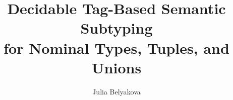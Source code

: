 \documentclass[sigplan,review]{acmart}\settopmatter{printfolios=true,printccs=false,printacmref=false}
\begin{document}
\title[Tag-Based Semantic Subtyping]{Decidable Tag-Based Semantic Subtyping \\
	for Nominal Types, Tuples, and Unions}



\author{Julia Belyakova}
\end{document}
